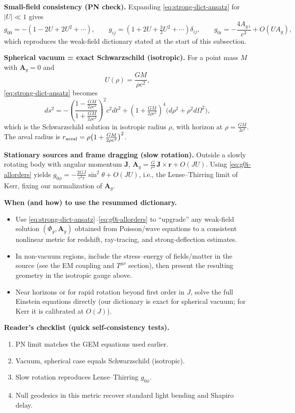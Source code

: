 \medskip
\noindent\textbf{Small-field consistency (PN check).}
Expanding \eqref{eq:strong-dict-ansatz} for \(|U|\ll 1\) gives
\[
g_{00}=-(1-2U+2U^2+\cdots),\qquad
g_{ij}=(1+2U+\tfrac{3}{2}U^2+\cdots)\delta_{ij},\qquad
g_{0i}=-\frac{4A_{g\,i}}{c^3}+O(UA_g),
\]
which reproduces the weak-field dictionary stated at the start of this subsection.

\medskip
\noindent\textbf{Spherical vacuum = exact Schwarzschild (isotropic).}
For a point mass \(M\) with \(\mathbf A_g=0\) and
\[
U(\rho)=\frac{GM}{\rho c^2},
\]
\eqref{eq:strong-dict-ansatz} becomes
\[
ds^2=-\left(\frac{1-\tfrac{GM}{2\rho c^2}}{1+\tfrac{GM}{2\rho c^2}}\right)^{\!2}c^2dt^2
+\left(1+\tfrac{GM}{2\rho c^2}\right)^{\!4}\big(d\rho^2+\rho^2 d\Omega^2\big),
\]
which is the Schwarzschild solution in isotropic radius \(\rho\), with horizon at \(\rho=\tfrac{GM}{2c^2}\).
The areal radius is \(r_{\rm areal}=\rho\big(1+\tfrac{GM}{2\rho c^2}\big)^{2}\).

\medskip
\noindent\textbf{Stationary sources and frame dragging (slow rotation).}
Outside a slowly rotating body with angular momentum \(\mathbf J\),
\(\mathbf A_g=\tfrac{G}{r^3}\,\mathbf J\times\mathbf r + O(JU)\).
Using \eqref{eq:g0i-allorders} yields \(g_{0\phi}=-\tfrac{2GJ}{c^3 r}\sin^2\theta+O(JU)\),
i.e., the Lense--Thirring limit of Kerr, fixing our normalization of \(\mathbf A_g\).

\medskip
\noindent\textbf{When (and how) to use the resummed dictionary.}
\begin{itemize}
  \item Use \eqref{eq:strong-dict-ansatz}--\eqref{eq:g0i-allorders} to ``upgrade'' any weak-field solution \((\Phi_g,\mathbf A_g)\) obtained from Poisson/wave equations to a consistent nonlinear metric for redshift, ray-tracing, and strong-deflection estimates.
  \item In non-vacuum regions, include the stress--energy of fields/matter in the source (see the EM coupling and \(T^{\mu\nu}\) section), then present the resulting geometry in the isotropic gauge above.
  \item Near horizons or for rapid rotation beyond first order in \(J\), solve the full Einstein equations directly (our dictionary is exact for spherical vacuum; for Kerr it is calibrated at \(O(J)\)).
\end{itemize}

\medskip
\noindent\textbf{Reader’s checklist (quick self-consistency tests).}
\begin{enumerate}
  \item PN limit matches the GEM equations used earlier.
  \item Vacuum, spherical case equals Schwarzschild (isotropic).
  \item Slow rotation reproduces Lense--Thirring \(g_{0\phi}\).
  \item Null geodesics in this metric recover standard light bending and Shapiro delay.
\end{enumerate}

